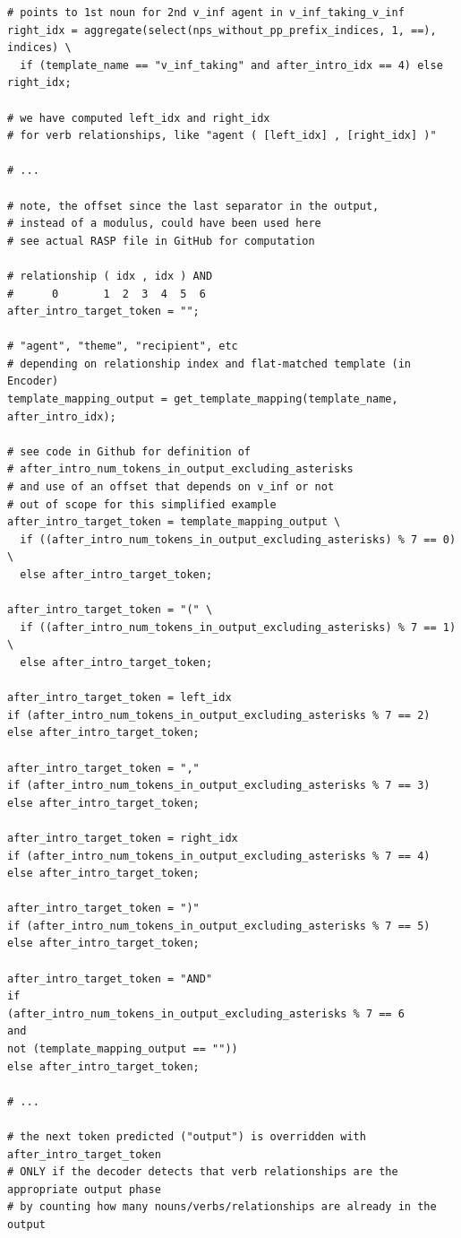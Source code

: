 \documentclass[11pt]{article}
\begin{document}
\begin{tiny}
\begin{verbatim}
# points to 1st noun for 2nd v_inf agent in v_inf_taking_v_inf
right_idx = aggregate(select(nps_without_pp_prefix_indices, 1, ==), indices) \
  if (template_name == "v_inf_taking" and after_intro_idx == 4) else right_idx;

# we have computed left_idx and right_idx
# for verb relationships, like "agent ( [left_idx] , [right_idx] )"

# ...

# note, the offset since the last separator in the output,
# instead of a modulus, could have been used here
# see actual RASP file in GitHub for computation

# relationship ( idx , idx ) AND
#      0       1  2  3  4  5  6
after_intro_target_token = "";

# "agent", "theme", "recipient", etc 
# depending on relationship index and flat-matched template (in Encoder)
template_mapping_output = get_template_mapping(template_name, after_intro_idx);

# see code in Github for definition of 
# after_intro_num_tokens_in_output_excluding_asterisks
# and use of an offset that depends on v_inf or not
# out of scope for this simplified example
after_intro_target_token = template_mapping_output \
  if ((after_intro_num_tokens_in_output_excluding_asterisks) % 7 == 0) \
  else after_intro_target_token;

after_intro_target_token = "(" \
  if ((after_intro_num_tokens_in_output_excluding_asterisks) % 7 == 1) \
  else after_intro_target_token;

after_intro_target_token = left_idx 
if (after_intro_num_tokens_in_output_excluding_asterisks % 7 == 2)
else after_intro_target_token;

after_intro_target_token = "," 
if (after_intro_num_tokens_in_output_excluding_asterisks % 7 == 3)
else after_intro_target_token;

after_intro_target_token = right_idx 
if (after_intro_num_tokens_in_output_excluding_asterisks % 7 == 4)
else after_intro_target_token;

after_intro_target_token = ")" 
if (after_intro_num_tokens_in_output_excluding_asterisks % 7 == 5) 
else after_intro_target_token;

after_intro_target_token = "AND"
if 
(after_intro_num_tokens_in_output_excluding_asterisks % 7 == 6
and
not (template_mapping_output == ""))
else after_intro_target_token;

# ...

# the next token predicted ("output") is overridden with after_intro_target_token
# ONLY if the decoder detects that verb relationships are the appropriate output phase
# by counting how many nouns/verbs/relationships are already in the output
\end{verbatim}
\end{tiny}
\end{document}

